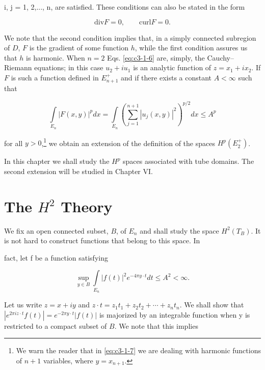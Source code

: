 i, j = 1, 2,..., n, are satisfied. These conditions can also be stated in the form

\begin{equation}
\tag{1.6$'$}\label{eq:c3-1-6p}
\text{div}F=0,\qquad\text{curl}F=0.
\end{equation}

We note that the second condition implies that, in a simply connected subregion of $D$, $F$ is the gradient of some function $h$, while the first condition assures us that $h$ is harmonic. When $n = 2$ Eqs. \eqref{eq:c3-1-6} are, simply, the Cauchy--Riemann equations; in this case $u_2 + i u_1$ is an analytic function of $z = x_1 + ix_2$. If $F$ is such a function defined in $E_{n+1}^+$ and if there exists a constant $A < \infty$ such that

\begin{equation}\label{eq:c3-1-7}
\int\limits_{E_{n}}|F(x,y)|^{p} dx=\int\limits_{E_{n}}\left(\sum_{j=1}^{n+1}|u_{j}(x,y)|^{2}\right)^{p/2}dx\leq A^{p}
\end{equation}

for all $y > 0$,\footnote{We warn the reader that in \eqref{eq:c3-1-7} we are dealing with harmonic functions of $n + 1$ variables, where $y = x_{n+1}$.} we obtain an extension of the definition of the spaces $H^{p}(E_{2}^{+})$.

In this chapter we shall study the $H^{p}$ spaces associated with tube domains. The second extension will be studied in Chapter VI.

\section{The  $H^{2}$ Theory}

We fix an open connected subset, $B$, of $E_n$ and shall study the space $H^2(T_B)$. It is not hard to construct functions that belong to this space. In

fact, let f be a function satisfying

\begin{equation}\label{eq:c3-2-1}
\sup_{y\in B}\int\limits_{E_{n}}\left|f(t)\right|^{2}e^{-4\pi y\cdot t}dt\leq A^{2}<\infty.
\end{equation}

Let us write $z = x + iy$ and $z \cdot t = z_1t_1 + z_2t_2 + \cdots + z_n t_n$. We shall show that $|e^{2\pi i z \cdot t} f(t)| = e^{-2\pi y \cdot t} |f(t)|$ is majorized by an integrable function when y is restricted to a compact subset of $B$. We note that this implies

